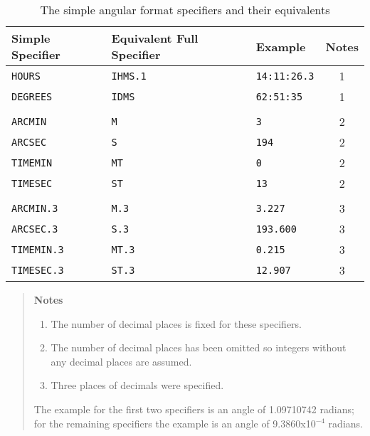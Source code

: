 \documentclass[11pt,twoside]{starlink}
\begin{document}
\begin{table}[htbp]

\begin{center}
\begin{tabular}{lllc}
Simple Specifier & Equivalent Full Specifier & Example & Notes \\ \hline
\texttt{HOURS}      & \texttt{IHMS.1} & \texttt{14:11:26.3} & 1  \\
\texttt{DEGREES}    & \texttt{IDMS}   & \texttt{62:51:35}   & 1  \\
                 &              &                  &    \\
\texttt{ARCMIN}     & \texttt{M}      & \texttt{3}          & 2  \\
\texttt{ARCSEC}     & \texttt{S}      & \texttt{194}        & 2  \\
\texttt{TIMEMIN}    & \texttt{MT}     & \texttt{0}          & 2  \\
\texttt{TIMESEC}    & \texttt{ST}     & \texttt{13}         & 2  \\
                 &              &                  &    \\
\texttt{ARCMIN.3}   & \texttt{M.3}    & \texttt{3.227}      & 3  \\
\texttt{ARCSEC.3}   & \texttt{S.3}    & \texttt{193.600}    & 3  \\
\texttt{TIMEMIN.3}  & \texttt{MT.3}   & \texttt{0.215}      & 3  \\
\texttt{TIMESEC.3}  & \texttt{ST.3}   & \texttt{12.907}     & 3  \\
\end{tabular}

\vspace{4mm}

\begin{quote}
\textbf{Notes}

\begin{enumerate}

  \item The number of decimal places is fixed for these specifiers.

  \item The number of decimal places has been omitted so integers
   without any decimal places are assumed.

  \item Three places of decimals were specified.

\end{enumerate}

The example for the first two specifiers is an angle of 1.09710742 radians;
for the remaining specifiers the example is an angle of 9.3860x10$^{-4}$
radians.

\end{quote}

\caption{\label{SEXAG_SIMPLE}The simple angular format specifiers and
their equivalents}
\end{center}

\end{table}
\end{document}
